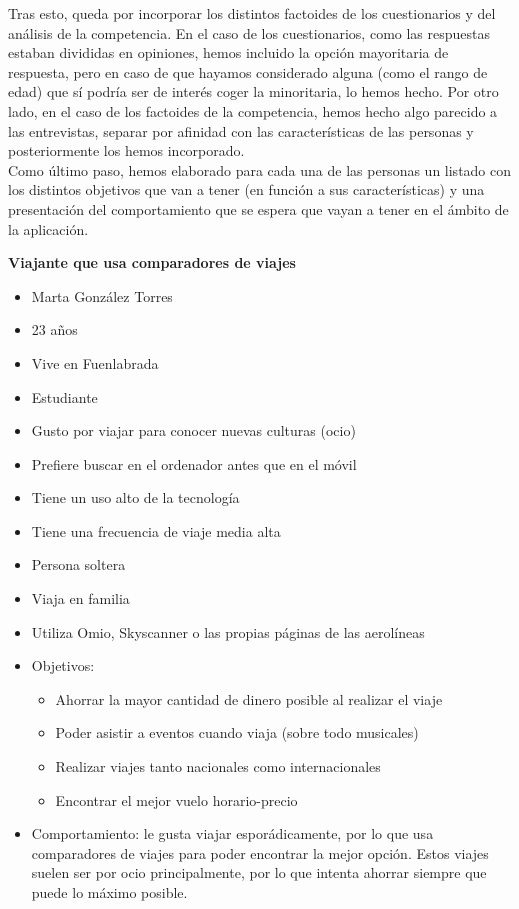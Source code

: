 Tras esto, queda por incorporar los distintos factoides de los cuestionarios y del análisis de la competencia. En el caso de los cuestionarios, como las respuestas
estaban divididas en opiniones, hemos incluido la opción mayoritaria de respuesta, pero en caso de que hayamos considerado alguna (como el rango de edad) que sí podría
ser de interés coger la minoritaria, lo hemos hecho. Por otro lado, en el caso de los factoides de la competencia, hemos hecho algo parecido a las entrevistas, separar
por afinidad con las características de las personas y posteriormente los hemos incorporado. \\

Como último paso, hemos elaborado para cada una de las personas un listado con los distintos objetivos que van a tener (en función a sus características) y una presentación
del comportamiento que se espera que vayan a tener en el ámbito de la aplicación.

\noindent \textbf{Viajante que usa comparadores de viajes}
\begin{itemize}
    \item Marta González Torres
    \item 23 años
    \item Vive en Fuenlabrada
    \item Estudiante
    \item Gusto por viajar para conocer nuevas culturas (ocio)
    \item Prefiere buscar en el ordenador antes que en el móvil
    \item Tiene un uso alto de la tecnología
    \item Tiene una frecuencia de viaje media alta
    \item Persona soltera
    \item Viaja en familia
    \item Utiliza Omio, Skyscanner o las propias páginas de las aerolíneas
    \item Objetivos:
    \begin{itemize}
        \item Ahorrar la mayor cantidad de dinero posible al realizar el viaje
        \item Poder asistir a eventos cuando viaja (sobre todo musicales)
        \item Realizar viajes tanto nacionales como internacionales
        \item Encontrar el mejor vuelo horario-precio
    \end{itemize}
    \item Comportamiento: le gusta viajar esporádicamente, por lo que usa comparadores de viajes para poder encontrar la mejor opción. Estos 
    viajes suelen ser por ocio principalmente, por lo que intenta ahorrar siempre que puede lo máximo posible.     
\end{itemize}

